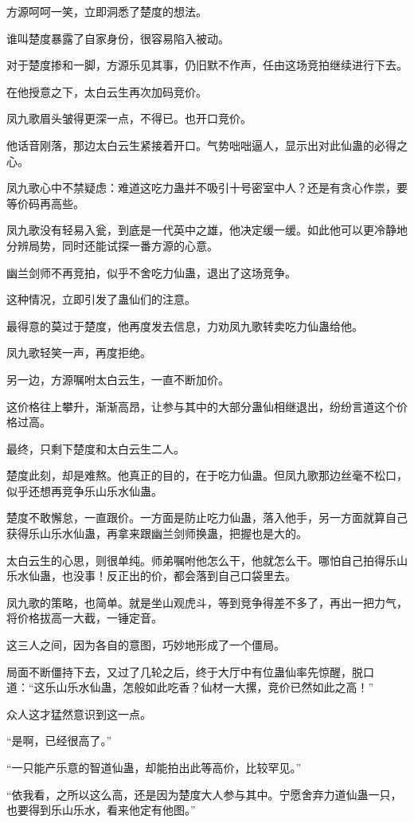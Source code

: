 \begin{this_body}
方源呵呵一笑，立即洞悉了楚度的想法。

谁叫楚度暴露了自家身份，很容易陷入被动。

对于楚度掺和一脚，方源乐见其事，仍旧默不作声，任由这场竞拍继续进行下去。

在他授意之下，太白云生再次加码竞价。

凤九歌眉头皱得更深一点，不得已。也开口竞价。

他话音刚落，那边太白云生紧接着开口。气势咄咄逼人，显示出对此仙蛊的必得之心。

凤九歌心中不禁疑虑：难道这吃力蛊并不吸引十号密室中人？还是有贪心作祟，要等价码再高些。

凤九歌没有轻易入瓮，到底是一代英中之雄，他决定缓一缓。如此他可以更冷静地分辨局势，同时还能试探一番方源的心意。

幽兰剑师不再竞拍，似乎不舍吃力仙蛊，退出了这场竞争。

这种情况，立即引发了蛊仙们的注意。

最得意的莫过于楚度，他再度发去信息，力劝凤九歌转卖吃力仙蛊给他。

凤九歌轻笑一声，再度拒绝。

另一边，方源嘱咐太白云生，一直不断加价。

这价格往上攀升，渐渐高昂，让参与其中的大部分蛊仙相继退出，纷纷言道这个价格过高。

最终，只剩下楚度和太白云生二人。

楚度此刻，却是难熬。他真正的目的，在于吃力仙蛊。但凤九歌那边丝毫不松口，似乎还想再竞争乐山乐水仙蛊。

楚度不敢懈怠，一直跟价。一方面是防止吃力仙蛊，落入他手，另一方面就算自己获得乐山乐水仙蛊，再拿来跟幽兰剑师换蛊，把握也是大的。

太白云生的心思，则很单纯。师弟嘱咐他怎么干，他就怎么干。哪怕自己拍得乐山乐水仙蛊，也没事！反正出的价，都会落到自己口袋里去。

凤九歌的策略，也简单。就是坐山观虎斗，等到竞争得差不多了，再出一把力气，将价格拔高一大截，一锤定音。

这三人之间，因为各自的意图，巧妙地形成了一个僵局。

局面不断僵持下去，又过了几轮之后，终于大厅中有位蛊仙率先惊醒，脱口道：“这乐山乐水仙蛊，怎般如此吃香？仙材一大摞，竞价已然如此之高！”

众人这才猛然意识到这一点。

“是啊，已经很高了。”

“一只能产乐意的智道仙蛊，却能拍出此等高价，比较罕见。”

“依我看，之所以这么高，还是因为楚度大人参与其中。宁愿舍弃力道仙蛊一只，也要得到乐山乐水，看来他定有他图。”


\end{this_body}
